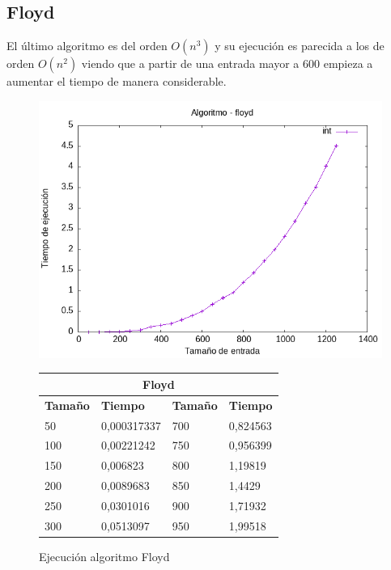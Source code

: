 \documentclass[11pt]{article}
\begin{document}
\subsection*{Floyd}
El último algoritmo es del orden $O(n^3)$ y su ejecución es parecida a los de orden $O(n^2)$ viendo que a partir de una entrada mayor a 
600 empieza a aumentar el tiempo de manera considerable.
\begin{figure}[H]
    \begin{minipage}{0.5\textwidth}
        \centering
        \includegraphics[width=\linewidth]{assets/Img/floydint.png}
        \caption{Ejecución algoritmo Floyd}
        \label{fig:floyd}
    \end{minipage}
    \begin{minipage}{0.5\textwidth}
        \centering
        \small
        \begin{tabular}{|l|l|l|l|}
        \hline
        \multicolumn{4}{|c|}{\cellcolor{blue!20}\textbf{Floyd}} \\ \hline 
        \textbf{Tamaño} & \textbf{Tiempo} & \textbf{Tamaño} & \textbf{Tiempo} \\ \hline
        50 & 0,000317337 & 700 & 0,824563 \\ \hline
        100 & 0,00221242 & 750 & 0,956399 \\ \hline
        150 & 0,006823 & 800 & 1,19819 \\ \hline
        200 & 0,0089683 & 850 & 1,4429 \\ \hline
        250 & 0,0301016 & 900 & 1,71932 \\ \hline
        300 & 0,0513097 & 950 & 1,99518 \\ \hline

\end{tabular}
\end{minipage}
\end{figure}
\end{document}

